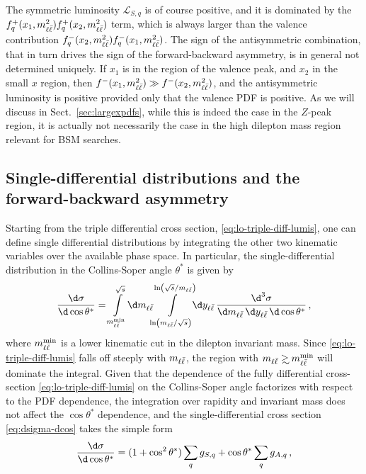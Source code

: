 The symmetric luminosity $\mathcal{L}_{S,q}$ is of course positive,
and it is
dominated by the $f_q^+(x_1,m_{\ell\bar{\ell}}^2) f_{q}^+(x_2,m_{\ell\bar{\ell}}^2)$ term, which
is always larger than the valence contribution 
$f_q^-(x_2,m_{\ell\bar{\ell}}^2) f_{q}^-(x_1,m_{\ell\bar{\ell}}^2)$.
The sign of the antisymmetric combination, that in turn
drives the sign of the
forward-backward asymmetry, is in general not determined
uniquely.
%
If $x_1$ is in the region of the valence peak, and $x_2$ in
the small $x$ region, then $f^-(x_1,m_{\ell\bar{\ell}}^2)\gg f^-(x_2,m_{\ell\bar{\ell}}^2)$, and the
antisymmetric luminosity is positive provided only that the valence PDF is positive.
%
As we will discuss in Sect.~\ref{sec:largexpdfs},
while this is indeed the case in
the $Z$-peak region, it is actually not necessarily the case in the
high dilepton mass region relevant for BSM searches.

\subsection{Single-differential distributions and the forward-backward asymmetry}
\label{sec:numlo}
Starting from the triple differential cross section,
\cref{eq:lo-triple-diff-lumis}, one can define 
single differential distributions by integrating the other two kinematic variables
over the available phase space.
%
In particular, the single-differential distribution in the
Collins-Soper angle $\theta^*$ is given by
\begin{equation}
  \label{eq:dsigma-dcos}
  \frac{\d\sigma}{\d\cos\theta^*} = \int\limits_{\mll^{{\rm min}}}^{\sqrt s}\!\d\mll\!\!\int\limits_{\ln(\mll/\sqrt s)}^{\ln(\sqrt s/\mll)}\!\!\d\yll\, \frac{\d^3 \sigma}{\d \mll \, \d \yll \, \d\cos\theta^*} \, ,
\end{equation}
where $m_{\ell\bar{\ell}}^{{\rm min}}$ is a lower kinematic cut in the dilepton invariant mass.
%
Since \cref{eq:lo-triple-diff-lumis}
falls off steeply with $m_{\ell\bar{\ell}}$, the region with $\mll \gsim \mll^{{\rm min}}$
will dominate the integral.
%
Given that the dependence of the fully differential cross-section
\cref{eq:lo-triple-diff-lumis}
on  the Collins-Soper angle factorizes with respect to the PDF
dependence, the integration over rapidity and invariant mass does not
affect the  $\cos\theta^*$ dependence, and the single-differential
cross section \cref{eq:dsigma-dcos} takes the simple form 
\begin{equation}
  \label{eq:dsigma-dcos-v2}
  \frac{\d\sigma}{\d\cos\theta^*} = (1+\cos^2\theta^*)\sum_q g_{S,q} + \cos\theta^*\sum_q g_{A,q} \, ,
\end{equation}
